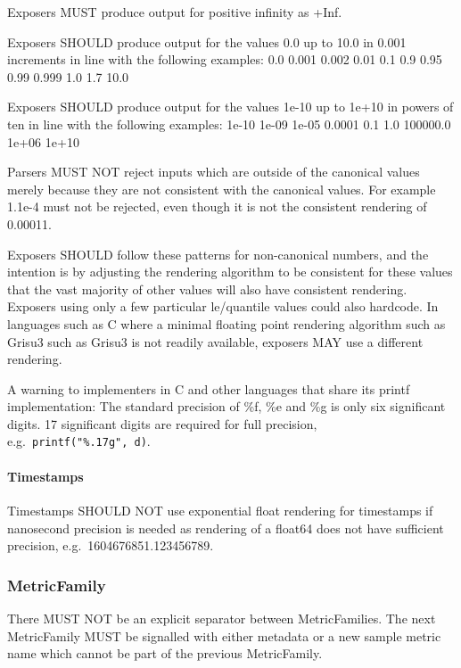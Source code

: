 \documentclass[a4paper,12pt,notitlepage,twoside,openright]{article}
\begin{document}
Exposers MUST produce output for positive infinity as +Inf.

Exposers SHOULD produce output for the values 0.0 up to 10.0 in 0.001
increments in line with the following examples: 0.0 0.001 0.002 0.01 0.1
0.9 0.95 0.99 0.999 1.0 1.7 10.0

Exposers SHOULD produce output for the values 1e-10 up to 1e+10 in
powers of ten in line with the following examples: 1e-10 1e-09 1e-05
0.0001 0.1 1.0 100000.0 1e+06 1e+10

Parsers MUST NOT reject inputs which are outside of the canonical values
merely because they are not consistent with the canonical values. For
example 1.1e-4 must not be rejected, even though it is not the
consistent rendering of 0.00011.

Exposers SHOULD follow these patterns for non-canonical numbers, and the
intention is by adjusting the rendering algorithm to be consistent for
these values that the vast majority of other values will also have
consistent rendering. Exposers using only a few particular le/quantile
values could also hardcode. In languages such as C where a minimal
floating point rendering algorithm such as Grisu3 such as Grisu3 is not
readily available, exposers MAY use a different rendering.

A warning to implementers in C and other languages that share its printf
implementation: The standard precision of \%f, \%e and \%g is only six
significant digits. 17 significant digits are required for full
precision, e.g.~\texttt{printf("\%.17g",\ d)}.

\hypertarget{timestamps-1}{%
\paragraph{Timestamps}\label{timestamps-1}}

Timestamps SHOULD NOT use exponential float rendering for timestamps if
nanosecond precision is needed as rendering of a float64 does not have
sufficient precision, e.g.~1604676851.123456789.

\hypertarget{metricfamily-1}{%
\subsubsection{MetricFamily}\label{metricfamily-1}}

There MUST NOT be an explicit separator between MetricFamilies. The next
MetricFamily MUST be signalled with either metadata or a new sample
metric name which cannot be part of the previous MetricFamily.
\end{document}

